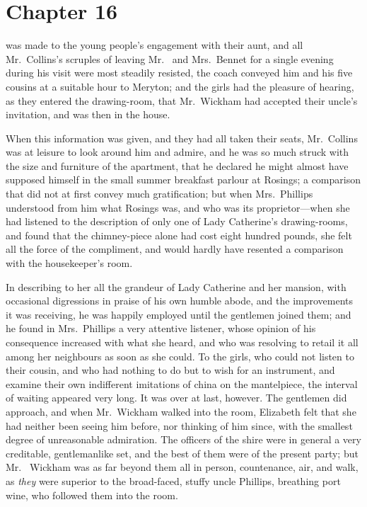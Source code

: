 \chapter{Chapter 16}


 was made to the young people's engagement
with their aunt, and all Mr.\ Collins's scruples of leaving Mr.\ %
and Mrs.\ Bennet for a single evening during his visit were most
steadily resisted, the coach conveyed him and his five cousins
at a suitable hour to Meryton; and the girls had the pleasure of
hearing, as they entered the drawing-room, that Mr.\ Wickham
had accepted their uncle's invitation, and was then in the house.

When this information was given, and they had all taken their
seats, Mr.\ Collins was at leisure to look around him and admire,
and he was so much struck with the size and furniture of the
apartment, that he declared he might almost have supposed
himself in the small summer breakfast parlour at Rosings; a
comparison that did not at first convey much gratification; but
when Mrs.\ Phillips understood from him what Rosings was, and
who was its proprietor---when she had listened to the description
of only one of Lady Catherine's drawing-rooms, and found that
the chimney-piece alone had cost eight hundred pounds, she felt
all the force of the compliment, and would hardly have resented
a comparison with the housekeeper's room.

In describing to her all the grandeur of Lady Catherine and her
mansion, with occasional digressions in praise of his own humble
abode, and the improvements it was receiving, he was happily
employed until the gentlemen joined them; and he found in
Mrs.\ Phillips a very attentive listener, whose opinion of
his consequence increased with what she heard, and who was
resolving to retail it all among her neighbours as soon as she
could.  To the girls, who could not listen to their cousin,
and who had nothing to do but to wish for an instrument, and
examine their own indifferent imitations of china on the
mantelpiece, the interval of waiting appeared very long.  It was
over at last, however.  The gentlemen did approach, and when
Mr.\ Wickham walked into the room, Elizabeth felt that she had
neither been seeing him before, nor thinking of him since, with
the smallest degree of unreasonable admiration.  The officers of
the \gdash{}shire were in general a very creditable, gentlemanlike
set, and the best of them were of the present party; but Mr.\ %
Wickham was as far beyond them all in person, countenance, air,
and walk, as \emph{they} were superior to the broad-faced, stuffy
uncle Phillips, breathing port wine, who followed them into
the room.

